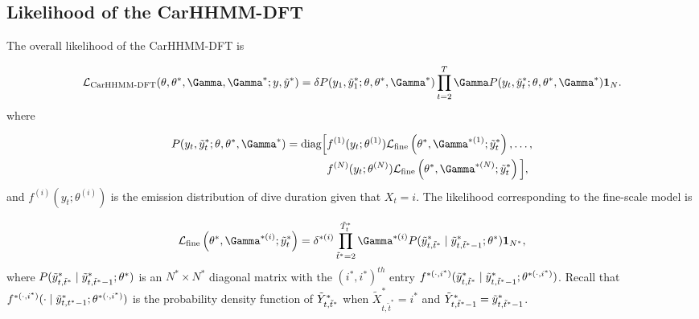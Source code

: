 
\subsection{Likelihood of the CarHHMM-DFT}

The overall likelihood of the CarHHMM-DFT is

\[\calL_{\text{CarHHMM-DFT}}(\theta,\theta^*,\Gamma,\Gamma^*;y,\z) = \delta P(y_1,\z_1;\theta,\theta^*,\Gamma^*) \prod_{t=2}^T \Gamma P(y_t,\z_t;\theta,\theta^*,\Gamma^*) \mathbf{1}_N.\]
%
where

\begin{align*}
P(y_t,\z_t;\theta,\theta^*,\Gamma^*)  = \text{diag}\Big[&f^{(1)}(y_t;\theta^{(1)})\calL_{\text{fine}}\left(\theta^*,\Gamma^{*(1)};\z_t\right), \ldots , \\
&f^{(N)}(y_t;\theta^{(N)})\calL_{\text{fine}}\left(\theta^*,\Gamma^{*(N)};\z_t\right) \Big],
\end{align*}
%
and $f^{(i)}(y_t;\theta^{(i)})$ is the emission distribution of dive duration given that $X_t = i$. The likelihood corresponding to the fine-scale model is

\[\calL_{\text{fine}}\left(\theta^{*},\Gamma^{*(i)};\z_t\right) = \delta^{*(i)} \prod_{\tilde t^* = 2}^{\tilde T^*_t} \Gamma^{*(i)} P(\z_{t,\tilde t^*} \mid \z_{t,\tilde t^*-1};\theta^*) \mathbf{1}_{N^*},\]
%
where $P(\tilde{y}^*_{t,\tilde t^*}\mid\tilde{y}^*_{t,\tilde t^*-1};\theta^*)$ is an $N^* \times N^*$ diagonal matrix with the $(i^*,i^*)^{th}$ entry $f^{*(\cdot,i^*)}(\tilde{y}^*_{t,\tilde t^*}\mid\tilde{y}^*_{t,\tilde t^*-1}; \theta^{*(\cdot,i^*)})$.
%
Recall that $f^{*(\cdot,i^*)}(\cdot \mid \tilde{y}^*_{t,t^*-1}; \theta^{*(\cdot,i^*)})$ is the probability density function of $\tilde{Y}^*_{t,\tilde t^*}$ when $\tilde X^*_{t,\tilde t^*} = i^*$ and $\tilde{Y}^*_{t,\tilde t^*-1} = \tilde{y}^*_{t,\tilde t^*-1}$.


